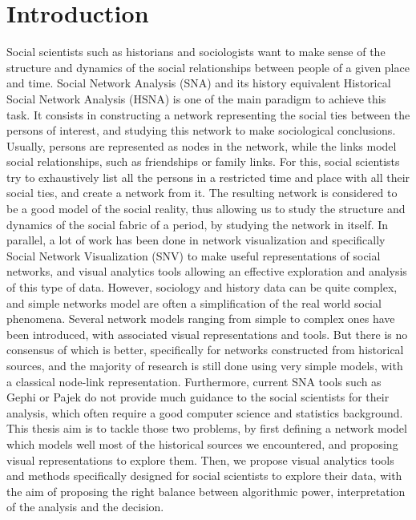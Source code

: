 


\chapter{Introduction}

Social scientists such as historians and sociologists want to make sense of the structure and dynamics of the social relationships between people of a given place and time.
Social Network Analysis (SNA) and its history equivalent Historical Social Network Analysis (HSNA) is one of the main paradigm to achieve this task.
It consists in constructing a network representing the social ties between the persons of interest, and studying this network to make sociological conclusions. Usually, persons are represented as nodes in the network, while the links model social relationships, such as friendships or family links. For this, social scientists try to exhaustively list all the persons in a restricted time and place with all their social ties, and create a network from it.
The resulting network is considered to be a good model of the social reality, thus allowing us to study the structure and dynamics of the social fabric of a period, by studying the network in itself.
In parallel, a lot of work has been done in network visualization and specifically Social Network Visualization (SNV) to make useful representations of social networks, and visual analytics tools allowing an effective exploration and analysis of this type of data.
However, sociology and history data can be quite complex, and simple networks model are often a simplification of the real world social phenomena.
Several network models ranging from simple to complex ones have been introduced, with associated visual representations and tools. But there is no consensus of which is better, specifically for networks constructed from historical sources, and the majority of research is still done using very simple models, with a classical node-link representation.
Furthermore, current SNA tools such as Gephi or Pajek do not provide much guidance to the social scientists for their analysis, which often require a good computer science and statistics background.
This thesis aim is to tackle those two problems, by first defining a network model which models well most of the historical sources we encountered, and proposing visual representations to explore them.
Then, we propose visual analytics tools and methods specifically designed for social scientists to explore their data, with the aim of proposing the right balance between algorithmic power, interpretation of the analysis and the decision.

